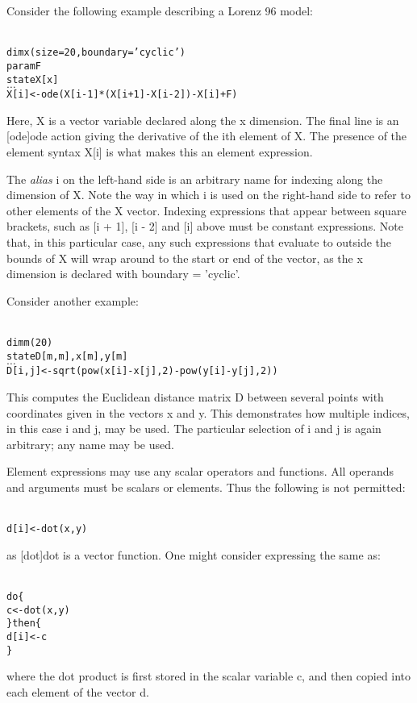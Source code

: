 Consider the following example describing a Lorenz 96 model:

\begin{alltt}{\sf
    dim x(size = 20, boundary = 'cyclic')
    param F
    state X[x]
    \(\ldots\)
    X[i] <- ode(X[i - 1]*(X[i + 1] - X[i - 2]) - X[i] + F)
}\end{alltt}

Here, \textsf{X} is a vector variable declared along the \textsf{x}
dimension. The final line is an \hyperref[hyper][ode]{\sf ode}
action giving the derivative of the \textsf{i}th element of \textsf{X}. The
presence of the element syntax \textsf{X[i]} is what makes this an element
expression.

The \textit{alias} \textsf{i} on the left-hand side is an arbitrary name for
indexing along the dimension of \textsf{X}. Note the way in which \textsf{i}
is used on the right-hand side to refer to other elements of the \textsf{X}
vector. Indexing expressions that appear between square brackets, such as
\textsf{[i + 1]}, \textsf{[i - 2]} and \textsf{[i]} above must be constant
expressions. Note that, in this particular case,
any such expressions that evaluate to outside the bounds of \textsf{X} will
wrap around to the start or end of the vector, as the \textsf{x} dimension is
declared with \textsf{boundary = 'cyclic'}.

Consider another example:
\begin{alltt}{\sf
    dim m(20)
    state D[m,m], x[m], y[m]
    \(\ldots\)
    D[i,j] <- sqrt(pow(x[i] - x[j], 2) - pow(y[i] - y[j], 2))
}\end{alltt}

This computes the Euclidean distance matrix \textsf{D} between several points
with coordinates given in the vectors \textsf{x} and \textsf{y}. This
demonstrates how multiple indices, in this case \textsf{i} and \textsf{j}, may
be used. The particular selection of \textsf{i} and \textsf{j} is again
arbitrary; any name may be used.

Element expressions may use any scalar operators and functions. All operands
and arguments must be scalars or elements. Thus the following is not
permitted:
\begin{alltt}{\sf
    d[i] <- dot(x, y)
}\end{alltt}
as \hyperref[hyper][dot]{\sf dot} is a vector function. One might
consider expressing the same as:
\begin{alltt}{\sf
    do \{
      c <- dot(x,y)
    \} then \{
      d[i] <- c
    \}
}\end{alltt}
where the dot product is first stored in the scalar variable \textsf{c}, and
then copied into each element of the vector \textsf{d}.

